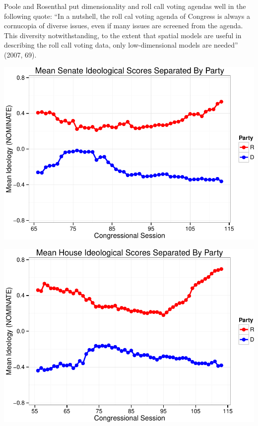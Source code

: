 \documentclass[12pt,twoside]{reedthesis}
\begin{document}
  Poole and Rosenthal put dimensionality and roll call voting agendas well
  in the following quote: ``In a nutshell, the roll cal voting agenda of
  Congress is always a cornucopia of diverse issues, even if many issues
  are screened from the agenda. This diversity notwithstanding, to the
  extent that spatial models are useful in describing the roll call voting
  data, only low-dimensional models are needed'' (2007, 69).
  
  \begin{center}\includegraphics{trautlein_thesis_files/figure-latex/plotted_senate_means-1} \end{center}
  
  \begin{center}\includegraphics{trautlein_thesis_files/figure-latex/plotted_house_means-1} \end{center}
  
\end{document}
